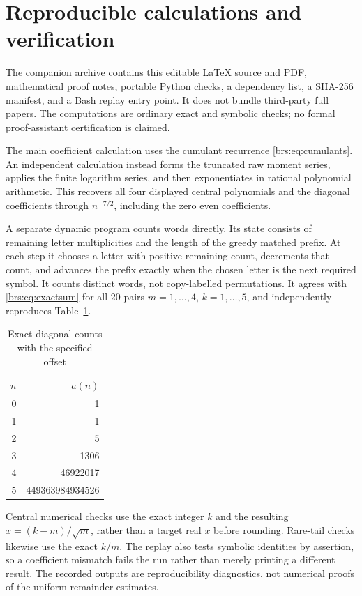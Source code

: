 \documentclass[11pt]{article}
\numberwithin{equation}{section}
\theoremstyle{remark}\newtheorem{remark}[theorem]{Remark}
\begin{document}
\section{Reproducible calculations and verification}\label{brs:sec:reproduce}

The companion archive contains this editable \LaTeX{} source and PDF,
mathematical proof notes, portable Python checks, a dependency list,
a SHA-256 manifest, and a Bash replay entry point.  It does not bundle
third-party full papers.  The computations are ordinary exact and
symbolic checks; no formal proof-assistant certification is claimed.

The main coefficient calculation uses the cumulant recurrence
\eqref{brs:eq:cumulants}.  An independent calculation instead forms the
truncated raw moment series, applies the finite logarithm series, and
then exponentiates in rational polynomial arithmetic.  This recovers
all four displayed central polynomials and the diagonal coefficients
through $n^{-7/2}$, including the zero even coefficients.

A separate dynamic program counts words directly.  Its state consists
of remaining letter multiplicities and the length of the greedy matched
prefix.  At each step it chooses a letter with positive remaining count,
decrements that count, and advances the prefix exactly when the chosen
letter is the next required symbol.  It counts distinct words, not
copy-labelled permutations.  It agrees with \eqref{brs:eq:exactsum} for all
$20$ pairs $m=1,\ldots,4$, $k=1,\ldots,5$, and independently reproduces
Table~\ref{brs:tab:counts}.

\begin{table}[ht]
\centering
\caption{Exact diagonal counts with the specified offset}\label{brs:tab:counts}
\begin{tabular}{@{}rr@{}}\toprule
$n$ & $a(n)$\\\midrule
0 & 1\\
1 & 1\\
2 & 5\\
3 & 1306\\
4 & 46922017\\
5 & 449363984934526\\\bottomrule
\end{tabular}
\end{table}

Central numerical checks use the exact integer $k$ and the resulting
$x=(k-m)/\sqrt m$, rather than a target real $x$ before rounding.
Rare-tail checks likewise use the exact $k/m$.
The replay also tests symbolic identities by assertion, so a coefficient
mismatch fails the run rather than merely printing a different result.
The recorded outputs are reproducibility diagnostics, not numerical
proofs of the uniform remainder estimates.
\end{document}

